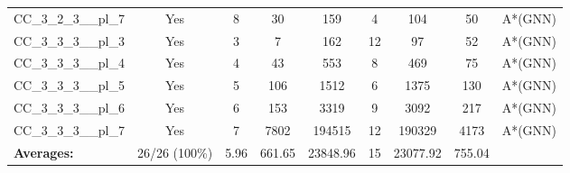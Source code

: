 \documentclass{article}
\begin{document}
\begin{tabular}{lcccccccc}
CC\_3\_2\_3\_\_pl\_7 & Yes & 8 & 30 & 159 & 4 & 104 & 50 & A*(GNN) \\
CC\_3\_3\_3\_\_pl\_3 & Yes & 3 & 7 & 162 & 12 & 97 & 52 & A*(GNN) \\
CC\_3\_3\_3\_\_pl\_4 & Yes & 4 & 43 & 553 & 8 & 469 & 75 & A*(GNN) \\
CC\_3\_3\_3\_\_pl\_5 & Yes & 5 & 106 & 1512 & 6 & 1375 & 130 & A*(GNN) \\
CC\_3\_3\_3\_\_pl\_6 & Yes & 6 & 153 & 3319 & 9 & 3092 & 217 & A*(GNN) \\
CC\_3\_3\_3\_\_pl\_7 & Yes & 7 & 7802 & 194515 & 12 & 190329 & 4173 & A*(GNN) \\
\textbf{Averages:} & 26/26 (100\%) & 5.96 & 661.65 & 23848.96 & 15 & 23077.92 & 755.04 & \\
\bottomrule
\end{tabular}
\\[0.7cm]
\end{document}
